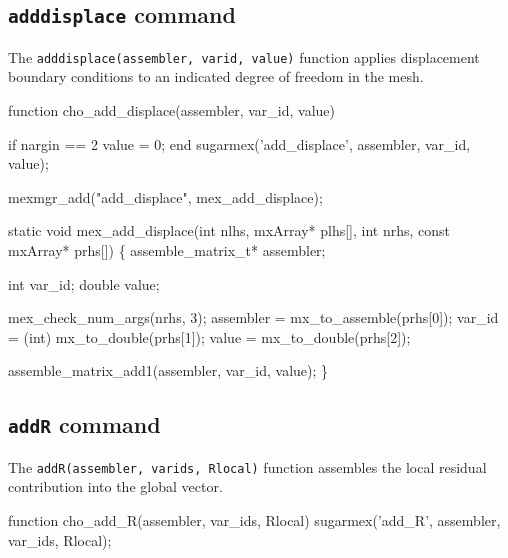 \subsection{{\tt{}add{}displace} command}

The {\tt{}add{}displace(assembler,\ var{}id,\ value)} function applies displacement
boundary conditions to an indicated degree of freedom in the mesh.

\nwenddocs{}\endmoddef
function cho_add_displace(assembler, var_id, value)

if nargin == 2
    value = 0;
end
sugarmex('add_displace', assembler, var_id, value);
\nwendcode{}\nwdocspar

\nwenddocs{}\plusendmoddef
mexmgr_add("add_displace", mex_add_displace);
\nwendcode{}\nwdocspar

\nwenddocs{}\plusendmoddef
static void mex_add_displace(int nlhs, mxArray* plhs[],
                             int nrhs, const mxArray* prhs[])
\{
    assemble_matrix_t* assembler;

    int     var_id;
    double  value;

    mex_check_num_args(nrhs, 3);
    assembler = mx_to_assemble(prhs[0]);
    var_id    = (int) mx_to_double(prhs[1]);
    value     = mx_to_double(prhs[2]);

    assemble_matrix_add1(assembler, var_id, value);
\}

\nwendcode{}\nwdocspar


\subsection{{\tt{}add{}R} command}

The {\tt{}add{}R(assembler,\ var{}ids,\ Rlocal)} function assembles the local
residual contribution into the global vector.

\nwenddocs{}\endmoddef
function cho_add_R(assembler, var_ids, Rlocal)
sugarmex('add_R', assembler, var_ids, Rlocal);
\nwendcode{}\nwdocspar

